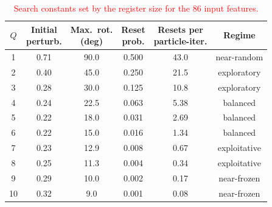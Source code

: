 \documentclass[11pt]{article}
\begin{document}
\setcounter{table}{4}
\begin{table}[H]
\centering
\scriptsize
\caption{\textcolor{red}{Search constants set by the
register size for the 86 input features.}}

\setlength{\tabcolsep}{4pt}
\renewcommand{\arraystretch}{1.05}
\color{red}
\begin{adjustbox}{max width=\linewidth}
\begin{tabular}{cccccc}
\hline\toprule
$Q$ & \makecell{Initial\\perturb.} & \makecell{Max.\ rot.\\(deg)} & \makecell{Reset\\prob.} & \makecell{Resets per\\particle-iter.} & Regime \\
\hline\toprule
1  & 0.71 & 90.0 & 0.500  & 43.0 & near-random \\
2  & 0.40 & 45.0 & 0.250  & 21.5 & exploratory \\
3  & 0.28 & 30.0 & 0.125  & 10.8 & exploratory \\
4  & 0.24 & 22.5 & 0.063  & 5.38 & balanced \\
5  & 0.22 & 18.0 & 0.031  & 2.69 & balanced \\
6  & 0.22 & 15.0 & 0.016  & 1.34 & balanced \\
7  & 0.23 & 12.9 & 0.008  & 0.67 & exploitative \\
8  & 0.25 & 11.3 & 0.004  & 0.34 & exploitative \\
9  & 0.29 & 10.0 & 0.002  & 0.17 & near-frozen \\
10 & 0.32 & 9.0  & 0.001  & 0.08 & near-frozen \\
\hline\toprule
\end{tabular}
\end{adjustbox}
\end{table}
\end{document}
